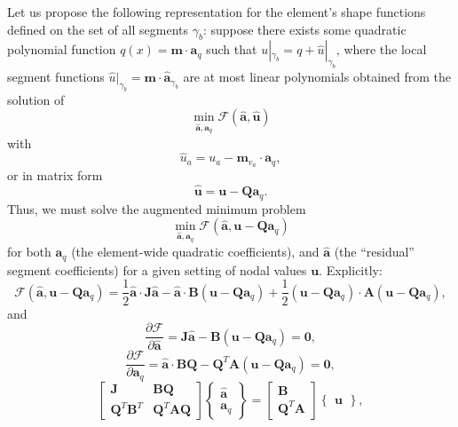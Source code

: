 \documentclass[12pt]{article}
\begin{document}
Let us propose the following representation for the element's shape functions defined on the set of all segments $\gamma_b$: suppose there exists some quadratic polynomial function $q(x) = \mathbf{m} \cdot \mathbf{a}_q$ such that $u |_{\gamma_b} = q + \hat{u} |_{\gamma_b}$, where the local segment functions $\hat{u} |_{\gamma_b} = \mathbf{m} \cdot \hat{\mathbf{a}}_{\gamma_b}$ are at most linear polynomials obtained from the solution of
\begin{equation}
	\min_{\hat{\mathbf{a}}, \mathbf{a}_q} \mathcal{F} (\hat{\mathbf{a}}, \hat{\mathbf{u}})
\end{equation}
with
\begin{equation}
	\hat{u}_a = u_a - \mathbf{m}_{v_a} \cdot \mathbf{a}_q,
\end{equation}
or in matrix form
\begin{equation}
	\hat{\mathbf{u}} = \mathbf{u} - \mathbf{Q} \mathbf{a}_q.
\end{equation}
Thus, we must solve the augmented minimum problem
\begin{equation}
	\min_{\hat{\mathbf{a}}, \mathbf{a}_q} \mathcal{F} (\hat{\mathbf{a}}, \mathbf{u} - \mathbf{Q} \mathbf{a}_q)
\end{equation}
for both $\mathbf{a}_q$ (the element-wide quadratic coefficients), and $\hat{\mathbf{a}}$ (the ``residual'' segment coefficients) for a given setting of nodal values $\mathbf{u}$. Explicitly:
\begin{equation}
        \mathcal{F} (\hat{\mathbf{a}}, \mathbf{u} - \mathbf{Q} \mathbf{a}_q) = \frac{1}{2} \hat{\mathbf{a}} \cdot \mathbf{J} \hat{\mathbf{a}} - \hat{\mathbf{a}} \cdot \mathbf{B} (\mathbf{u} - \mathbf{Q} \mathbf{a}_q) + \frac{1}{2} (\mathbf{u} - \mathbf{Q} \mathbf{a}_q) \cdot \mathbf{A} (\mathbf{u} - \mathbf{Q} \mathbf{a}_q),
\end{equation}
and
\begin{equation}
	\frac{\partial \mathcal{F}}{\partial \hat{\mathbf{a}}} = \mathbf{J} \hat{\mathbf{a}} - \mathbf{B} (\mathbf{u} - \mathbf{Q} \mathbf{a}_q) = \mathbf{0},
\end{equation}
\begin{equation}
	\frac{\partial \mathcal{F}}{\partial \mathbf{a}_q} = \hat{\mathbf{a}} \cdot \mathbf{B} \mathbf{Q} - \mathbf{Q}^T \mathbf{A} (\mathbf{u} - \mathbf{Q} \mathbf{a}_q) = \mathbf{0},
\end{equation}
\begin{equation}
	\left[ \begin{array}{cc} \mathbf{J} & \mathbf{B} \mathbf{Q} \\ \mathbf{Q}^T \mathbf{B}^T & \mathbf{Q}^T \mathbf{A} \mathbf{Q} \end{array} \right] \left\{ \begin{array}{c} \hat{\mathbf{a}} \\ \mathbf{a}_q \end{array} \right\} = \left[ \begin{array}{c} \mathbf{B} \\ \mathbf{Q}^T \mathbf{A} \end{array} \right] \left\{ \begin{array}{c} \mathbf{u} \end{array} \right\},
\end{equation}
\end{document}
